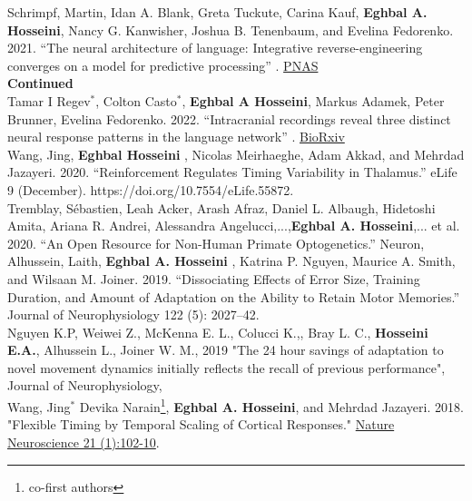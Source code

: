 \documentclass[margin, 10pt]{res}
\begin{document}
\begin{resume}
Schrimpf, Martin, Idan A. Blank, Greta Tuckute, Carina Kauf, {\bf Eghbal A. Hosseini}, Nancy G. Kanwisher, Joshua B. Tenenbaum, and Evelina Fedorenko. 2021. “The neural architecture of language: Integrative reverse-engineering converges on a model for predictive processing” . \href{https://doi.org/10.1101/2020.06.26.174482.}{PNAS}  \vspace{2.5mm} \\
\textbf{Continued} 
\vspace{2mm} \\
Tamar I Regev$^\ast$, Colton Casto$^\ast$, \textbf{Eghbal A Hosseini}, Markus Adamek, Peter Brunner, Evelina Fedorenko. 2022. “Intracranial recordings reveal three distinct neural response patterns in the language network” . \href{https://www.biorxiv.org/content/10.1101/2022.12.30.522216v1.abstract}{BioRxiv}  \vspace{2.5mm} \\
Wang, Jing, {\bf Eghbal Hosseini }, Nicolas Meirhaeghe, Adam Akkad, and Mehrdad Jazayeri. 2020. “Reinforcement Regulates Timing Variability in Thalamus.” eLife 9 (December). https://doi.org/10.7554/eLife.55872. \vspace{2.5mm} \\
Tremblay, Sébastien, Leah Acker, Arash Afraz, Daniel L. Albaugh, Hidetoshi Amita, Ariana R. Andrei, Alessandra Angelucci,...,{\bf Eghbal A. Hosseini},... et al. 2020. “An Open Resource for Non-Human Primate Optogenetics.” Neuron, \vspace{2.5mm} \\
Alhussein, Laith, {\bf Eghbal A. Hosseini }, Katrina P. Nguyen, Maurice A. Smith, and Wilsaan M. Joiner. 2019. “Dissociating Effects of Error Size, Training Duration, and Amount of Adaptation on the Ability to Retain Motor Memories.” Journal of Neurophysiology 122 (5): 2027–42. \vspace{2.5mm} \\
Nguyen K.P, Weiwei Z., McKenna E. L., Colucci K.,, Bray L. C.,{ \bf Hosseini E.A.}, Alhussein L., Joiner W. M., 2019 "The 24 hour savings of adaptation to novel movement dynamics initially reflects the recall of previous performance",  Journal of Neurophysiology,  \ 
\vspace{2.5mm} \\
Wang, Jing$^\ast$ Devika Narain\footnote{co-first authors}, {\bf Eghbal A. Hosseini}, and Mehrdad Jazayeri. 2018. "Flexible Timing by Temporal Scaling of Cortical Responses." \href{https://www.nature.com/articles/s41593-017-0028-6}{ Nature Neuroscience 21 (1):102-10}.

\end{resume}
\end{document}

